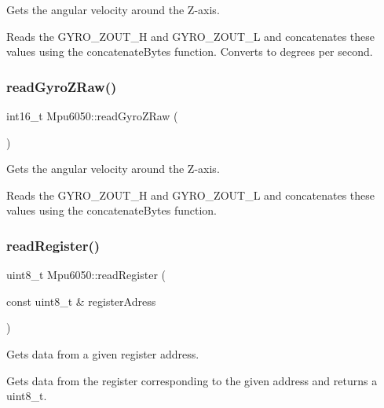Gets the angular velocity around the Z-\/axis. 

Reads the G\+Y\+R\+O\+\_\+\+Z\+O\+U\+T\+\_\+H and G\+Y\+R\+O\+\_\+\+Z\+O\+U\+T\+\_\+L and concatenates these values using the concatenate\+Bytes function. Converts to degrees per second. \mbox{\label{classMpu6050_a8cf0adb003855acc603230f6fd2e3887}} 
\subsubsection{\texorpdfstring{read\+Gyro\+Z\+Raw()}{readGyroZRaw()}}
{\footnotesize\ttfamily int16\+\_\+t Mpu6050\+::read\+Gyro\+Z\+Raw (\begin{DoxyParamCaption}{ }\end{DoxyParamCaption})\hspace{0.3cm}{\ttfamily [virtual]}}



Gets the angular velocity around the Z-\/axis. 

Reads the G\+Y\+R\+O\+\_\+\+Z\+O\+U\+T\+\_\+H and G\+Y\+R\+O\+\_\+\+Z\+O\+U\+T\+\_\+L and concatenates these values using the concatenate\+Bytes function. \mbox{\label{classMpu6050_a4a5c30be51cae90371221b41518cfd84}} 
\subsubsection{\texorpdfstring{read\+Register()}{readRegister()}}
{\footnotesize\ttfamily uint8\+\_\+t Mpu6050\+::read\+Register (\begin{DoxyParamCaption}\item[{const uint8\+\_\+t \&}]{register\+Adress }\end{DoxyParamCaption})\hspace{0.3cm}{\ttfamily [virtual]}}



Gets data from a given register address. 

Gets data from the register corresponding to the given address and returns a uint8\+\_\+t. \mbox{\label{classMpu6050_ad34c38e7656bfab491ebc1a9f8b21a6b}} 
